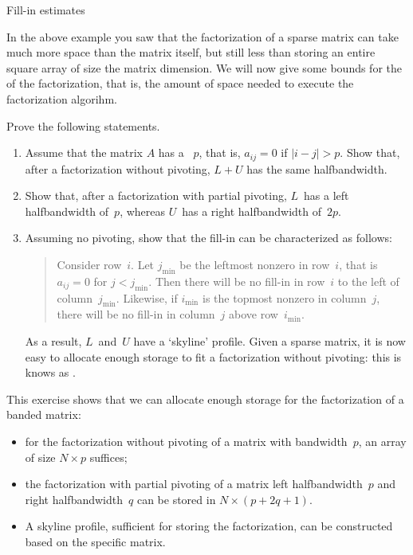  {Fill-in estimates}
\label{sec:bandfill}

In the above example you saw that the factorization of a sparse matrix
can take much more space than the matrix itself, but still less than
storing an entire square array of size the matrix dimension. We will now give
some bounds for the  of the
factorization, that is, the amount of space needed to execute the
factorization algorihm.

\begin{exercise}
\label{ex:skyline}
  Prove the following statements.
  \begin{enumerate}
  \item Assume that the matrix $A$ has a
    ~$p$, that is, $a_{ij}=0$ if
    $|i-j|>p$. Show that, after a factorization without pivoting,
    $L+U$ has the same halfbandwidth.
  \item Show that, after a factorization with partial pivoting,
    $L$~has a left halfbandwidth of~$p$, whereas $U$~has a
    right halfbandwidth of~$2p$.
  \item Assuming no pivoting, show that the fill-in can be
    characterized as follows:
    \begin{quote}
      Consider row~$i$. Let $j_{\min}$ be the leftmost nonzero in
      row~$i$, that is $a_{ij}=0$ for $j<j_{\min}$. Then there will be
      no fill-in in row~$i$ to the left of
      column~$j_{\min}$. Likewise, if $i_{\min}$ is the topmost
      nonzero in column~$j$, there will be no fill-in in column~$j$
      above row~$i_{\min}$.
    \end{quote}
    As a result, $L$~and~$U$ have a `skyline' profile. Given a sparse
    matrix, it is now easy to allocate enough storage to fit a
    factorization without pivoting: this is knows as
    .
  \end{enumerate}
\end{exercise}

This exercise shows that we can allocate enough storage for the
factorization of a banded matrix:
\begin{itemize}
\item for the factorization without pivoting of a matrix with
  bandwidth~$p$, an array of size $N\times p$ suffices;
\item the factorization with partial pivoting of a matrix left
  halfbandwidth~$p$ and right halfbandwidth~$q$ can be stored in
  $N\times (p+2q+1)$.
\item A skyline profile, sufficient for storing the factorization, can
  be constructed based on the specific matrix.
\end{itemize}

